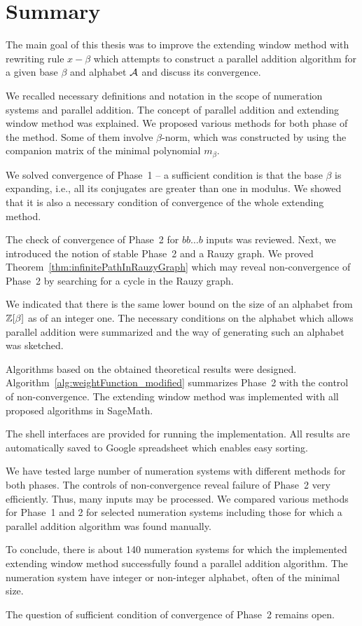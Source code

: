 \chapter*{Summary}
The main goal of this thesis was to improve the extending window method with rewriting rule $x-\beta$ which attempts to construct a parallel addition algorithm for a given base $\beta$ and alphabet $\mathcal{A}$ and discuss its convergence.

We  recalled necessary definitions and notation in the scope of numeration systems and parallel addition. The concept of parallel addition and extending  window method was explained. We proposed various methods for both phase of the method. Some of them involve $\beta$-norm, which was constructed by using the companion matrix of the minimal polynomial $m_\beta$.

We solved convergence of Phase~1 -- a sufficient condition is that the base $\beta$ is expanding, i.e., all its conjugates are greater than one in modulus. We showed that it is also a necessary condition of convergence of the whole extending method. 

The check of convergence of Phase~2 for $bb\dots b$ inputs was reviewed. Next, we introduced the notion of stable Phase~2 and a Rauzy graph. We proved Theorem~\ref{thm:infinitePathInRauzyGraph} which may reveal non-convergence of Phase~2 by searching for a cycle in the Rauzy graph.

We indicated that there is the same lower bound on the size of an alphabet from $\mathbb{Z}[\beta]$ as of an integer one. The necessary conditions on the alphabet which allows parallel addition were summarized and the way of generating such an alphabet was sketched.

Algorithms based on the obtained theoretical results were designed. Algorithm~\ref{alg:weightFunction_modified} summarizes Phase~2 with the control of non-convergence. The extending window method was implemented with all proposed algorithms in SageMath.

The shell interfaces are provided for running the implementation. All results are automatically saved to Google spreadsheet which enables easy sorting.

We have tested large number of numeration systems with different methods for both phases. The controls of non-convergence reveal failure of Phase~2 very efficiently. Thus, many inputs may be processed. We compared various methods for Phase~1 and 2 for selected numeration systems including those for which a parallel addition algorithm was found manually.

 To conclude, there is about 140 numeration systems for which the implemented extending window method successfully found a parallel addition algorithm. The numeration system have integer or non-integer alphabet, often of the minimal size.

The question of sufficient condition of convergence of Phase~2 remains open.


